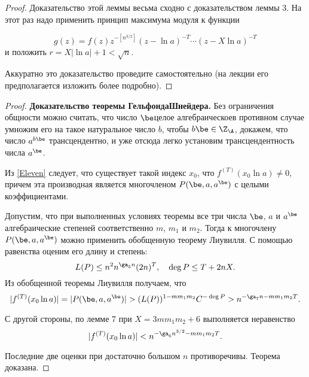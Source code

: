 \documentclass{article}
\begin{document}
\begin{proof}
Доказательство этой леммы весьма сходно с доказательством леммы 3. На этот
раз надо применить принцип максимума модуля к функции

$$
g(z)=f(z)z^{-[n^{3/2}]}(z-\ln a)^{-T} \cdots (z-X\ln a)^{-T}
$$
и положить $r=X|\ln a|+1<\sqrt n$.

Аккуратно это доказательство проведите самостоятельно (на лекции его
предполагается изложить более подробно).
\end{proof}

\begin{proof} \textbf{Доказательство теоремы Гельфонда\ч Шнейдера.} Без ограничения общности
можно считать, что число $\be$\т целое алгебраическое\т в противном случае
умножим его на такое натуральное число $b$,  чтобы
$b\be \in \Z_{\A}$,  докажем, что число $a^{b\be}$ трансцендентно,
и уже отсюда легко установим трансцендентность числа $a^{\be}$.

Из \eqref{Eleven} следует, что существует
такой индекс $x_0$, что $f^{(T)}(x_0\ln a) \ne 0$, причем эта производная является
многочленом $P(\be, a, a^{\be})$ с целыми коэффициентами.

Допустим, что при выполненных условиях теоремы все три числа
$\be$, $a$   и $a^{\be}$  алгебраические степеней
соответственно $m$, $m_1$ и  $m_2$. Тогда
к многочлену $P(\be, a, a^{\be}) $ можно применить обобщенную теорему
Лиувилля. С помощью равенства  оценим его длину и степень:
$$
L(P) \le n^2n^{\ga_5n}(2n)^T, \quad \deg P \le T+2nX.
$$
Из обобщенной теоремы Лиувилля получаем, что
$$
|f^{(T)}(x_0\ln a)|=|P(\be, a, a^{\be})|> (L(P))^{1-mm_1m_2}C^{-\deg P} >
n^{-\ga_7n-mm_1m_2T}.
$$

С другой стороны, по лемме 7 при $X=3mm_1m_2+6$ выполняется неравенство
$$
|f^{(T)}(x_0\ln a)| <n^{-\ga_6n^{3/2}-mm_1m_2T}.
$$

Последние две оценки при достаточно большом $n$ противоречивы. Теорема
доказана.
\end{proof}
\end{document}
